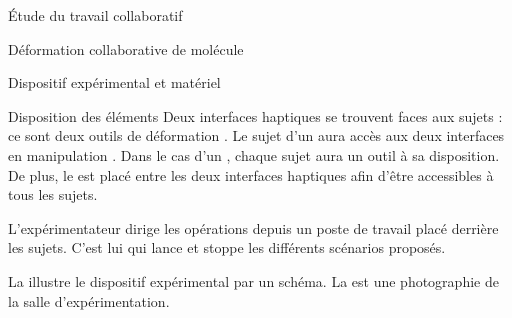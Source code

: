 \documentclass[myfrancais]{mythesis}
\begin{document}
\begin{mypart}{Étude du travail collaboratif}
\begin{mychapter}{Déformation collaborative de molécule}
\begin{mysection}{Dispositif expérimental et matériel}
\begin{mysubsection}{Disposition des éléments}
					Deux interfaces haptiques se trouvent faces aux sujets : ce sont deux outils de déformation  .
					Le sujet d'un  aura accès aux deux interfaces en manipulation .
					Dans le cas d'un , chaque sujet aura un outil à sa disposition.
					De plus, le \mySpaceNavigator est placé entre les deux interfaces haptiques afin d'être accessibles à tous les sujets.

					L'expérimentateur dirige les opérations depuis un poste de travail placé derrière les sujets.
					C'est lui qui lance et stoppe les différents scénarios proposés.

					La  illustre le dispositif expérimental par un schéma.
					La  est une photographie de la salle d'expérimentation.


\end{mysubsection}
\end{mysection}
\end{mychapter}
\end{mypart}
\end{document}

